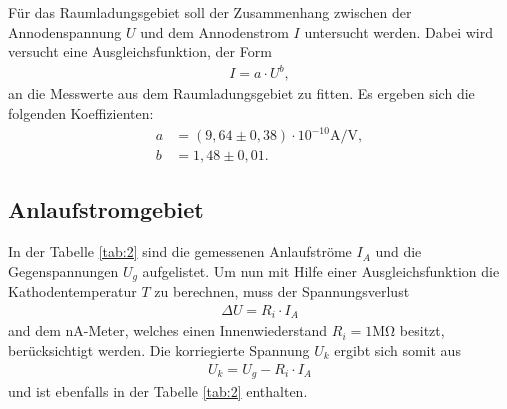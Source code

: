 Für das Raumladungsgebiet soll der Zusammenhang
zwischen der Annodenspannung $U$ und dem Annodenstrom $I$ untersucht
werden.
Dabei wird versucht eine Ausgleichsfunktion, der Form
\begin{align}
  I=a\cdot U^{b},
\end{align}
an die Messwerte aus dem Raumladungsgebiet zu fitten.
Es ergeben sich die folgenden Koeffizienten:
\begin{align*}
a&=(9,64\pm0,38)\cdot10^{-10}\si{\ampere\per\volt},\\
b&=1,48\pm0,01.
\end{align*}




\subsection{Anlaufstromgebiet}
In der Tabelle \ref{tab:2} sind die gemessenen Anlaufströme $I_A$
und die Gegenspannungen $U_g$ aufgelistet.
Um nun mit Hilfe einer Ausgleichsfunktion die Kathodentemperatur $T$
zu berechnen, muss der Spannungsverlust
\begin{align*}
  \Delta U=R_i\cdot I_A
\end{align*}
and dem nA-Meter, welches einen Innenwiederstand $R_i=1\si{\mega\ohm}$ besitzt,
berücksichtigt werden.
Die korriegierte Spannung $U_k$ ergibt sich somit aus
\begin{align}
U_k=U_g-R_i\cdot I_A \label{eqn:U_k}
\end{align}
und ist ebenfalls in der Tabelle \ref{tab:2} enthalten.

